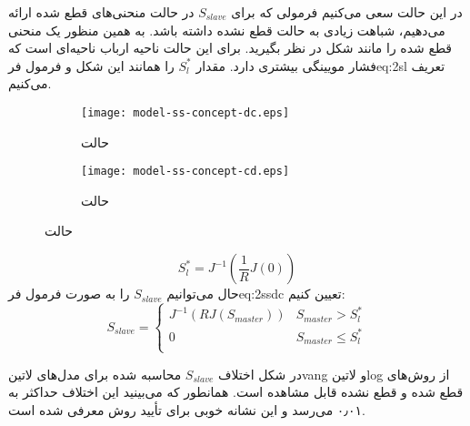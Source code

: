 در این حالت سعی می‌کنیم فرمولی که برای $S_{slave}$ در حالت منحنی‌های قطع شده ارائه می‌دهیم، شباهت زیادی به حالت قطع نشده داشته باشد. به همین منظور یک منحنی قطع شده را مانند شکل  در نظر بگیرید. برای این حالت ناحیه ارباب ناحیه‌ای است که فشار مویینگی بیشتری دارد. مقدار $S^*_l$ را همانند این شکل  و فرمول ‌فر{eq:2sl} تعریف می‌کنیم.
\begin{figure}
\begin{subfigure}{0.5\textwidth}
\texttt{[image: model-ss-concept-dc.eps]} 
\caption{حالت }
\label{fig:2schss-dc}
\end{subfigure}
\begin{subfigure}{0.5\textwidth}
\texttt{[image: model-ss-concept-cd.eps]}
\caption{حالت }
\label{fig:2schss-cd}
\end{subfigure}
\label{fig:2schss}
\end{figure}
\begin{equation}
\label{eq:2sl}
S_l^* = J^{-1}(\frac{1}{R}J(0))
\end{equation} 
حال می‌توانیم $S_{slave}$ را به صورت فرمول ‌فر{eq:2ssdc} تعیین کنیم:
\begin{equation}
\label{eq:2ssdc}
S_{slave} =
\begin{cases}
J^{-1}(RJ(S_{master})) &S_{master} > S_l^* \\
0 &S_{master} \leq S_l^* \\
\end{cases}
\end{equation} 

در شکل  اختلاف $S_{slave}$ محاسبه شده برای مدل‌های ‌لاتین{vang} و ‌لاتین{log} از روش‌های قطع شده و قطع نشده قابل مشاهده است. همانطور که می‌بینید این اختلاف حداکثر به ۰٫۰۱ می‌رسد و این نشانه خوبی برای تأیید روش معرفی شده است. 

